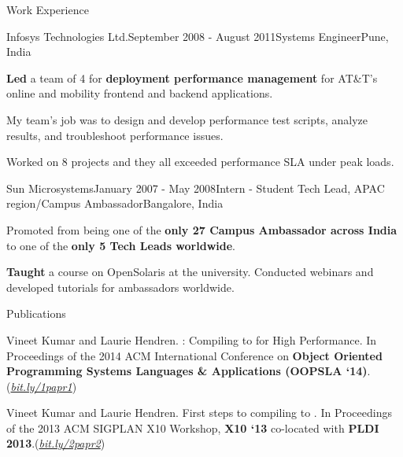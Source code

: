 \documentclass{resume} %
\begin{document}
\begin{rSection}{Work Experience}
\begin{rSubsection}{Infosys Technologies Ltd.}{September 2008 - August
        2011}{Systems Engineer}{Pune, India}
\item \textbf{Led} a team of 4 for \textbf{deployment performance management}
	for AT\&T's online and mobility frontend and backend applications.
\begin{lsubSubsection}
\item My team's job was to design and develop performance test scripts, analyze
	results, and troubleshoot performance issues.  
\item {Worked on 8 projects} and they all exceeded performance SLA under peak
	loads.
\end{lsubSubsection}
\end{rSubsection}

\begin{rSubsection}{Sun Microsystems}{January 2007 - May 2008}{Intern - Student
        Tech Lead, APAC region/Campus Ambassador}{Bangalore, India}
\item Promoted from being one of the \textbf{only 27 Campus Ambassador across
	India} to one of the \textbf{only 5 Tech Leads worldwide}.  
\begin{lsubSubsection}
\item \textbf{Taught} a course on OpenSolaris at the university. Conducted
	webinars and developed tutorials for ambassadors worldwide.
\end{lsubSubsection}
\end{rSubsection}
\end{rSection}


\begin{rSection}{Publications}
\smallskip
\begin{lSubsection}


\item Vineet Kumar and Laurie Hendren. \mixten: Compiling \matlab to \xten for
	High Performance. In Proceedings of the 2014 ACM International
	Conference on \textbf{Object Oriented Programming Systems Languages \&
	Applications (OOPSLA `14)}.(\href{http://bit.ly/1papr1}{\em{bit.ly/1papr1}})

%
\item Vineet Kumar and Laurie Hendren. First steps to compiling \matlab to
	\xten. In Proceedings of the 2013 ACM SIGPLAN X10 Workshop, \textbf{X10
	`13} co-located with \textbf{PLDI
	2013}.(\href{http://bit.ly/2papr2}{\em{bit.ly/2papr2}})
\end{lSubsection}
\end{rSection}
\end{document}

